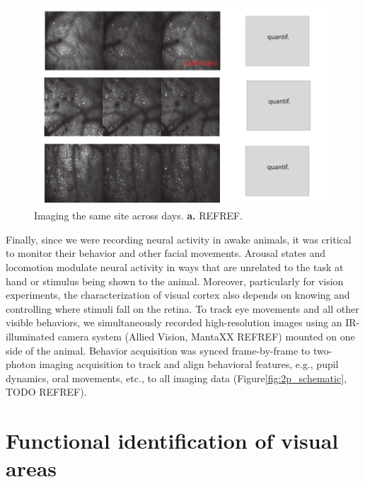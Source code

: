 \begin{figure}[t!]
    \includegraphics[width=\textwidth]{figures/chapter_2/multiday_imaging.pdf}
    \vspace{.1in}
    \caption[Multi-day imaging]{Imaging the same site across days. \textbf{a.} REFREF.
    \label{fig:multiday_imaging}}
\end{figure}


Finally, since we were recording neural activity in awake animals, it was critical to monitor their behavior and other facial movements. Arousal states and locomotion modulate neural activity in ways that are unrelated to the task at hand or stimulus being shown to the animal. Moreover, particularly for vision experiments, the characterization of visual cortex also depends on knowing and controlling where stimuli fall on the retina. To track eye movements and all other visible behaviors, we simultaneously recorded high-resolution images using an IR-illuminated camera system (Allied Vision, MantaXX REFREF) mounted on one side of the animal. Behavior acquisition was synced frame-by-frame to two-photon imaging acquisition to track and align behavioral features, e.g., pupil dynamics, oral movements, etc., to all imaging data (Figure\ref{fig:2p_schematic}, TODO REFREF).

\section{Functional identification of visual areas}

